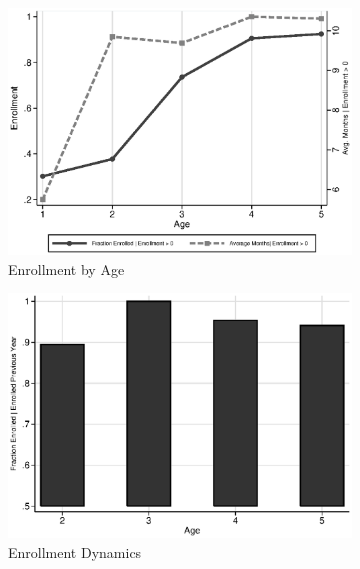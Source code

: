 \begin{figure}
\centering
\caption{Control Substitution Characteristics, ABC/CARE Control Group}\label{fig:control-sub}
\begin{subfigure}[h]{0.4\textwidth}
	\centering
	\caption{Enrollment by Age} \label{fig:salmonella}
		\includegraphics[width=\textwidth]{output/abccare_Valtenrollment.eps}
\end{subfigure}
\begin{subfigure}[h]{0.4\textwidth}
		\centering
		\caption{Enrollment Dynamics} \label{fig:treatsubcare_2}
		\includegraphics[width=\textwidth]{output/abccare_Vprobs.eps}
\end{subfigure}\\
\begin{subfigure}[h]{0.4\textwidth}

\end{subfigure}
\end{figure}
